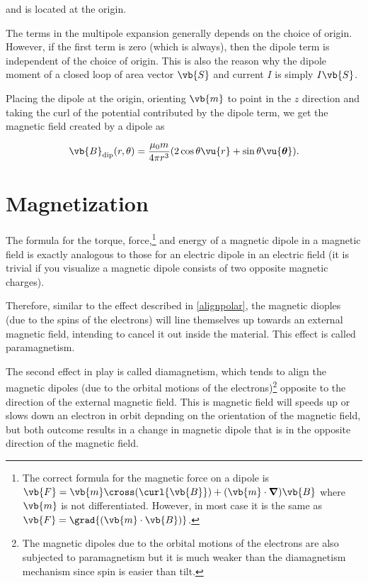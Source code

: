 \documentclass[english,a4paper,12pt]{report}
\begin{document}
and is located at the origin. 

The terms in the multipole expansion generally depends on the choice of origin. However, if the first term is zero (which is always), then the dipole term is independent of the choice of origin. This is also the reason why the dipole moment of a closed loop of area vector \(\vb{S} \) and current \(I\) is simply \(I\vb{S} \).    

Placing the dipole at the origin, orienting \(\vb{m} \) to point in the \(z\) direction and taking the curl of the potential contributed by the dipole term, we get the magnetic field created by a dipole as

\begin{equation}
    \vb{B} _{\text{dip} } (r, \theta ) = \frac{\mu_0 m}{4\pi r^3 }(2\cos \theta \vu{r} + \sin \theta \vu{\boldsymbol{\theta } }). 
\end{equation}

\section{Magnetization}



The formula for the torque, force,\footnote{The correct formula for the magnetic force on a dipole is \(\vb{F} = \vb{m} \cross (\curl{\vb{B} } ) + (\vb{m} \cdot \boldsymbol{\nabla } )\vb{B} \) where \(\vb{m} \) is not differentiated. However, in most case it is the same as \(\vb{F} = \grad{(\vb{m} \cdot \vb{B} )}\).}  and energy of a magnetic dipole in a magnetic field is exactly analogous to those for an electric dipole in an electric field (it is trivial if you visualize a magnetic dipole consists of two opposite magnetic charges).

Therefore, similar to the effect described in \cref{alignpolar}, the magnetic dioples (due to the spins of the electrons) will line themselves up towards an external magnetic field, intending to cancel it out inside the material. This effect is called paramagnetism. 

The second effect in play is called diamagnetism, which tends to align the magnetic dipoles (due to the orbital motions of the electrons)\footnote{The magnetic dipoles due to the orbital motions of the electrons are also subjected to paramagnetism but it is much weaker than the diamagnetism mechanism since spin is easier than tilt.}  opposite to the direction of the external magnetic field. This is magnetic field will speeds up or slows down an electron in orbit depnding on the orientation of the magnetic field, but both outcome results in a change in magnetic dipole that is in the opposite direction of the magnetic field. 
\end{document}
